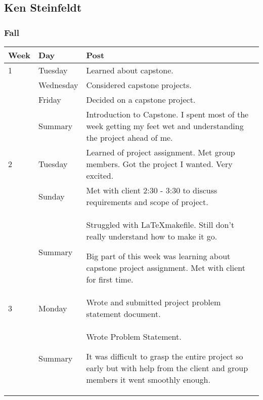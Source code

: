\subsection{Ken Steinfeldt}
\subsubsection{Fall}
\begin{longtable}{ | l | l | p{14cm} | }
\hline
Week & Day & Post \\
\hline
1 & Tuesday & Learned about capstone. \\
 & Wednesday & Considered capstone projects. \\
 & Friday & Decided on a capstone project. \\
\cline{2-3}
 & Summary & Introduction to Capstone. 
 I spent most of the week getting my feet wet and understanding the project ahead of me. \\
 \hline
2 & Tuesday & Learned of project assignment. Met group members. Got the project I wanted. Very excited. \\
 & Sunday & Met with client 2:30 - 3:30 to discuss requirements and scope of project. \\
\cline{2-3}
 & Summary & 
	Struggled with \LaTeX makefile. Still don't really understand how to make it go.

	Big part of this week was learning about capstone project assignment.
	Met with client for first time. \\
\hline
3 & Monday & Wrote and submitted project problem statement document.  \\
\cline{2-3}
 & Summary & 
Wrote Problem Statement.

It was difficult to grasp the entire project so early but with help from the client and group members it went smoothly enough.


\end{longtable}
